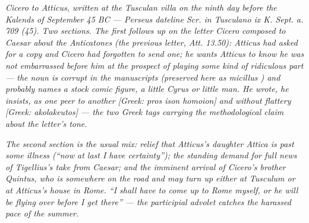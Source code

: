 
\textit{Cicero to Atticus, written at the Tusculan villa on the
ninth day before the Kalends of September 45 BC --- Perseus
dateline \textit{Scr. in Tusculano ix K. Sept. a. 709 (45)}. Two
sections. The first follows up on the letter Cicero composed to
Caesar about the \textit{Anticatones} (the previous letter, Att.
13.50): Atticus had asked for a copy and Cicero had forgotten to
send one; he wants Atticus to know he was not embarrassed before
him at the prospect of playing some kind of ridiculous part ---
the noun is corrupt in the manuscripts (preserved here as
\dag micillus \dag) and probably names a stock comic figure, a
\textit{little Cyrus} or \textit{little man}. He wrote, he
insists, as one peer to another \textit{[Greek: pros ison
homoion]} and without flattery \textit{[Greek: akolakeutos]} ---
the two Greek tags carrying the methodological claim about the
letter's tone.}

\textit{The second section is the usual mix: relief that Atticus's
daughter Attica is past some illness (``now at last I have
certainty''); the standing demand for full news of Tigellius's
take from Caesar; and the imminent arrival of Cicero's brother
Quintus, who is somewhere on the road and may turn up either at
Tusculum or at Atticus's house in Rome. ``I shall have to come up
to Rome myself, or he will be flying over before I get there''
--- the participial \textit{advolet} catches the harassed pace of
the summer.}
